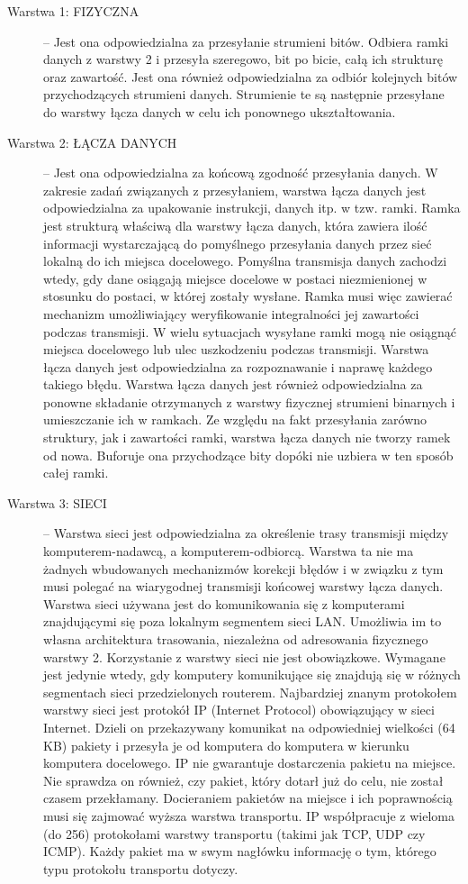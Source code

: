 \documentclass[a4paper,11pt]{article}
\begin{document}
\begin{description}
\item [Warstwa 1: FIZYCZNA] -- Jest ona odpowiedzialna za przesyłanie strumieni bitów. Odbiera ramki danych z warstwy 2 i przesyła szeregowo, bit po bicie, całą ich strukturę oraz zawartość. Jest ona również odpowiedzialna za odbiór kolejnych bitów przychodzących strumieni danych. Strumienie te są następnie przesyłane do warstwy łącza danych w celu ich ponownego ukształtowania.

\item [Warstwa 2: ŁĄCZA DANYCH] -- Jest ona odpowiedzialna za końcową zgodność przesyłania danych. W zakresie zadań związanych z przesyłaniem, warstwa łącza danych jest odpowiedzialna za upakowanie instrukcji, danych itp. w tzw. ramki. Ramka jest strukturą właściwą dla warstwy łącza danych, która zawiera ilość informacji wystarczającą do pomyślnego przesyłania danych przez sieć lokalną do ich miejsca docelowego. Pomyślna transmisja danych zachodzi wtedy, gdy dane osiągają miejsce docelowe w postaci niezmienionej w stosunku do postaci, w której zostały wysłane. Ramka musi więc zawierać mechanizm umożliwiający weryfikowanie integralności jej zawartości podczas transmisji. W wielu sytuacjach wysyłane ramki mogą nie osiągnąć miejsca docelowego lub ulec uszkodzeniu podczas transmisji. Warstwa łącza danych jest odpowiedzialna za rozpoznawanie i naprawę każdego takiego błędu. Warstwa łącza danych jest również odpowiedzialna za ponowne składanie otrzymanych z warstwy fizycznej strumieni binarnych i umieszczanie ich w ramkach. Ze względu na fakt przesyłania zarówno struktury, jak i zawartości ramki, warstwa łącza danych nie tworzy ramek od nowa. Buforuje ona przychodzące bity dopóki nie uzbiera w ten sposób całej ramki.

\item [Warstwa 3: SIECI] -- Warstwa sieci jest odpowiedzialna za określenie trasy transmisji między komputerem-nadawcą, a komputerem-odbiorcą. Warstwa ta nie ma żadnych wbudowanych mechanizmów korekcji błędów i w związku z tym musi polegać na wiarygodnej transmisji końcowej warstwy łącza danych. Warstwa sieci używana jest do komunikowania się z komputerami znajdującymi się poza lokalnym segmentem sieci LAN. Umożliwia im to własna architektura trasowania, niezależna od adresowania fizycznego warstwy 2. Korzystanie z warstwy sieci nie jest obowiązkowe. Wymagane jest jedynie wtedy, gdy komputery komunikujące się znajdują się w różnych segmentach sieci przedzielonych routerem. Najbardziej znanym protokołem warstwy sieci jest protokół IP (Internet Protocol) obowiązujący w sieci Internet. Dzieli on przekazywany komunikat na odpowiedniej wielkości (64 KB) pakiety i przesyła je od komputera do komputera w kierunku komputera docelowego. IP nie gwarantuje dostarczenia pakietu na miejsce. Nie sprawdza on również, czy pakiet, który dotarł już do celu, nie został czasem przekłamany. Docieraniem pakietów na miejsce i ich poprawnością musi się zajmować wyższa warstwa transportu. IP współpracuje z wieloma (do 256) protokołami warstwy transportu (takimi jak TCP, UDP czy ICMP). Każdy pakiet ma w swym nagłówku informację o tym, którego typu protokołu transportu dotyczy.


\end{description}
\end{document}
